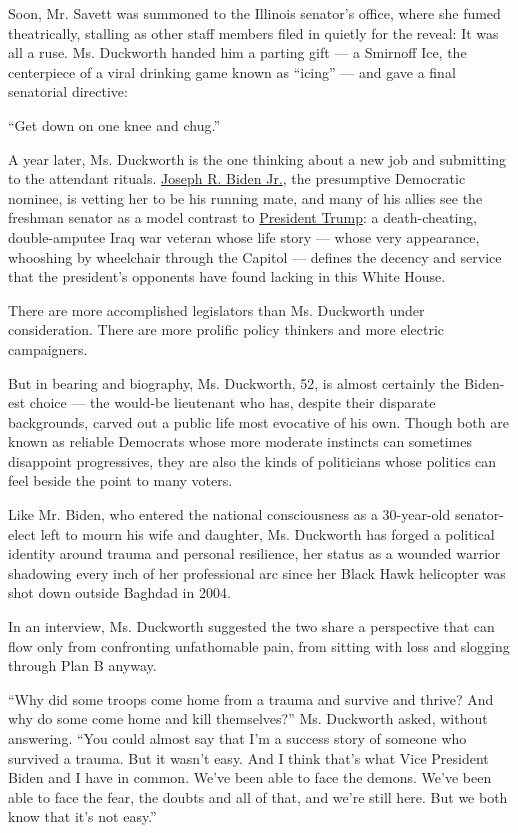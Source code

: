 Soon, Mr. Savett was summoned to the Illinois senator's office, where
she fumed theatrically, stalling as other staff members filed in quietly
for the reveal: It was all a ruse. Ms. Duckworth handed him a parting
gift --- a Smirnoff Ice, the centerpiece of a viral drinking game known
as ``icing'' --- and gave a final senatorial directive:

``Get down on one knee and chug.''

A year later, Ms. Duckworth is the one thinking about a new job and
submitting to the attendant rituals.
\href{https://www.nytimes3xbfgragh.onion/interactive/2020/us/elections/joe-biden.html}{Joseph
R. Biden Jr.}, the presumptive Democratic nominee, is vetting her to be
his running mate, and many of his allies see the freshman senator as a
model contrast to
\href{https://www.nytimes3xbfgragh.onion/interactive/2020/us/elections/donald-trump.html}{President
Trump}: a death-cheating, double-amputee Iraq war veteran whose life
story --- whose very appearance, whooshing by wheelchair through the
Capitol --- defines the decency and service that the president's
opponents have found lacking in this White House.

There are more accomplished legislators than Ms. Duckworth under
consideration. There are more prolific policy thinkers and more electric
campaigners.

But in bearing and biography, Ms. Duckworth, 52, is almost certainly the
Biden-est choice --- the would-be lieutenant who has, despite their
disparate backgrounds, carved out a public life most evocative of his
own. Though both are known as reliable Democrats whose more moderate
instincts can sometimes disappoint progressives, they are also the kinds
of politicians whose politics can feel beside the point to many voters.

Like Mr. Biden, who entered the national consciousness as a 30-year-old
senator-elect left to mourn his wife and daughter, Ms. Duckworth has
forged a political identity around trauma and personal resilience, her
status as a wounded warrior shadowing every inch of her professional arc
since her Black Hawk helicopter was shot down outside Baghdad in 2004.

In an interview, Ms. Duckworth suggested the two share a perspective
that can flow only from confronting unfathomable pain, from sitting with
loss and slogging through Plan B anyway.

``Why did some troops come home from a trauma and survive and thrive?
And why do some come home and kill themselves?'' Ms. Duckworth asked,
without answering. ``You could almost say that I'm a success story of
someone who survived a trauma. But it wasn't easy. And I think that's
what Vice President Biden and I have in common. We've been able to face
the demons. We've been able to face the fear, the doubts and all of
that, and we're still here. But we both know that it's not easy.''

